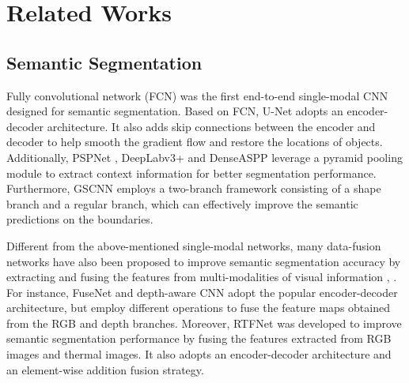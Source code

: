 \documentclass[runningheads]{llncs}
\begin{document}
\section{Related Works}
\label{sec.related_works}

\subsection{Semantic Segmentation}
\label{sec.semantic_segmentation}
Fully convolutional network (FCN) \cite{long2015fully} was the first end-to-end single-modal CNN designed for semantic segmentation. Based on FCN, U-Net \cite{ronneberger2015u} adopts an encoder-decoder architecture. It also adds skip connections between the encoder and decoder to help smooth the gradient flow and restore the locations of objects. Additionally, PSPNet \cite{zhao2017pyramid}, DeepLabv3+ \cite{chen2018encoder} and DenseASPP \cite{yang2018denseaspp} leverage a pyramid pooling module to extract context information for better segmentation performance. Furthermore, GSCNN \cite{takikawa2019gated} employs a two-branch framework consisting of a shape branch and a regular branch, which can effectively improve the semantic predictions on the boundaries.

Different from the above-mentioned single-modal networks, many data-fusion networks have also been proposed to improve semantic segmentation accuracy by extracting and fusing the features from multi-modalities of visual information \cite{wang2020applying}, \cite{fan2020sne-roadseg}. For instance, FuseNet \cite{hazirbas2016fusenet} and depth-aware CNN \cite{wang2018depth} adopt the popular encoder-decoder architecture, but employ different operations to fuse the feature maps obtained from the RGB and depth branches. Moreover, RTFNet \cite{sun2019rtfnet} was developed to improve semantic segmentation performance by fusing the features extracted from RGB images and thermal images. It also adopts an encoder-decoder architecture and an element-wise addition fusion strategy.
\end{document}
